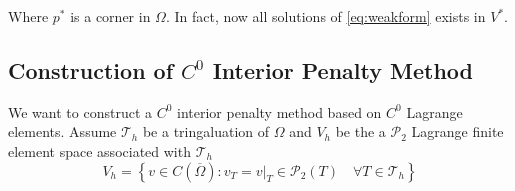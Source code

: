 Where $p^{*}$  is a corner in $\Omega $. In fact, now all solutions of \eqref{eq:weakform} exists in $V^{*}$.


\subsection{Construction of $C^{0}$ Interior Penalty Method}%
\label{sub:construction_interior_penalty_method}

We want to construct a $C^{0}$ interior penalty method based on $C^{0}$ Lagrange elements.
Assume $\mathcal{T}_{h} $ be a tringaluation of $\Omega $ and $V_{h}$ be the a $\mathcal{P}_{2} $ Lagrange finite
element space associated with $\mathcal{T}_{h} $ \[
V_{h} = \left\{ v \in C\left( \overline{\Omega } \right) : v_{T} = v |_{T} \in \mathcal{P}_{2}\left( T \right) \quad
\forall T \in  \mathcal{T} _{h}  \right\}

\]
